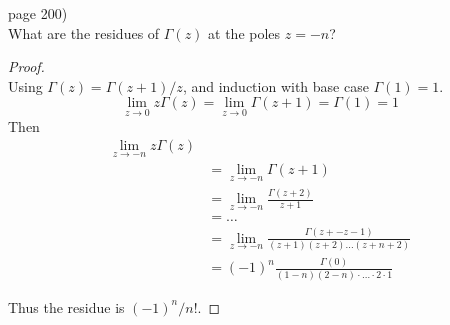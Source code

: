 \documentclass{article}
\newenvironment{problem}[2][Problem]{\begin{trivlist}
\item[\hskip \labelsep {\bfseries #1}\hskip \labelsep {\bfseries #2.}]}{\end{trivlist}}
\begin{document}
\begin{problem}{3} (page 200) \\
  What are the residues of $\Gamma(z)$ at the poles $z = -n$?
\end{problem}
\begin{proof} \text{} \\
  Using $\Gamma(z) = \Gamma(z + 1)/z$, and induction with base case
  $\Gamma(1) = 1$.
  \[
    \lim_{z\rightarrow 0} z\Gamma(z) = \lim_{z\rightarrow 0} \Gamma(z + 1) = \Gamma(1) = 1
  \]
  Then \begin{align*}
    \lim_{z\rightarrow -n} z\Gamma(z) \\
    &= \lim_{z\rightarrow -n} \Gamma(z + 1) \\
    &= \lim_{z\rightarrow -n} \frac{\Gamma(z + 2)}{z+1} \\
    &= \hdots \\
    &= \lim_{z\rightarrow -n} \frac{\Gamma(z + -z-1)}{(z+1)(z+2)\hdots(z+n+2)} \\
    &= (-1)^n\frac{\Gamma(0)}{(1-n)(2-n)\cdot\hdots \cdot 2 \cdot 1}
  \end{align*}

  Thus the residue is $(-1)^n/n!$.
\end{proof}
\pagebreak
\end{document}
